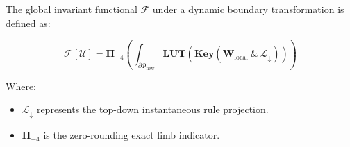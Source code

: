 The global invariant functional \(\mathcal{F}\) under a dynamic boundary transformation is defined as:

\[
\mathcal{F}[\mathcal{U}] = \mathbf{\Pi}_{-4} \left( \int_{\partial\Phi_{\text{new}}} \mathbf{LUT}\left( \mathbf{Key}\left( \mathbf{W}_{\text{local}} \ \& \ \mathcal{L}_{\downarrow} \right) \right) \right)
\]

Where:

\begin{itemize}
\item \(\mathcal{L}_{\downarrow}\) represents the top-down instantaneous rule projection.
\item \(\mathbf{\Pi}_{-4}\) is the zero-rounding exact limb indicator.
\end{itemize}
